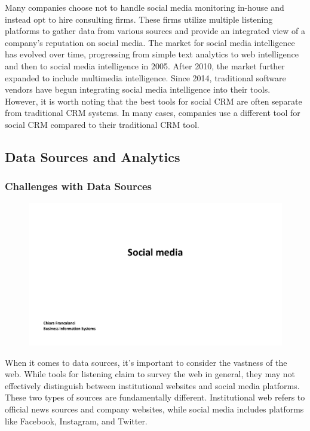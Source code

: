 Many companies choose not to handle social media monitoring in-house and
instead opt to hire consulting firms. These firms utilize multiple
listening platforms to gather data from various sources and provide an
integrated view of a company's reputation on social media. The market
for social media intelligence has evolved over time, progressing from
simple text analytics to web intelligence and then to social media
intelligence in 2005. After 2010, the market further expanded to include
multimedia intelligence. Since 2014, traditional software vendors have
begun integrating social media intelligence into their tools. However,
it is worth noting that the best tools for social CRM are often separate
from traditional CRM systems. In many cases, companies use a different
tool for social CRM compared to their traditional CRM tool.

\subsection{Data Sources and Analytics}\label{data-sources-and-analytics}

\subsubsection{Challenges with Data
  Sources}\label{challenges-with-data-sources}

\begin{figure}[!h]
  \centering
  \includegraphics[page=30, trim = 1cm 6.5cm 2cm 3.5cm, clip, width=\imagewidth]{images/04 - Social_Media.pdf}
\end{figure}

When it comes to data sources, it's important to consider the vastness
of the web. While tools for listening claim to survey the web in
general, they may not effectively distinguish between institutional
websites and social media platforms. These two types of sources are
fundamentally different. Institutional web refers to official news
sources and company websites, while social media includes platforms like
Facebook, Instagram, and Twitter.

